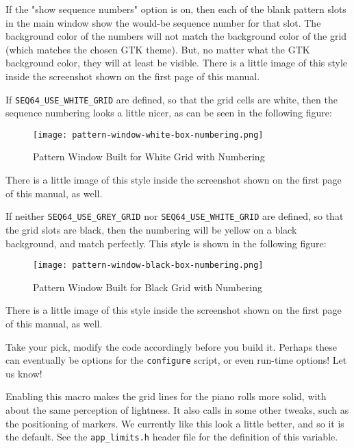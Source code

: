         If the "show sequence numbers" option is on, then each
        of the blank pattern slots in the main window show the would-be
        sequence number for that slot.  The background color of the numbers
        will not match the background color of the grid (which matches the
        chosen GTK theme).  But, no matter what the GTK background color, they
        will at least be visible.  There is a little image of this style inside
        the screenshot shown on the first page of this manual.

        If \texttt{SEQ64\_USE\_WHITE\_GRID}
        are defined, so that the grid cells are white, then the sequence
        numbering looks a little nicer, as can be seen in the following
        figure:

\begin{figure}[H]
   \centering 
   \texttt{[image: pattern-window-white-box-numbering.png]}
   \caption{Pattern Window Built for White Grid with Numbering}
   \label{fig:seq64_build_white_box_numbering}
\end{figure}

        There is a little image of this style inside the screenshot shown on
        the first page of this manual, as well.

        If neither \texttt{SEQ64\_USE\_GREY\_GRID} nor
        \texttt{SEQ64\_USE\_WHITE\_GRID} are defined, so that the grid slots
        are black, then the numbering will be yellow on a black background, and
        match perfectly.  This style is shown in the following figure:

\begin{figure}[H]
   \centering 
   \texttt{[image: pattern-window-black-box-numbering.png]}
   \caption{Pattern Window Built for Black Grid with Numbering}
   \label{fig:seq64_build_black_box_numbering}
\end{figure}

      There is a little image of this style inside the screenshot shown on
      the first page of this manual, as well.

      Take your pick, modify the code accordingly before you build it.
      Perhaps these can eventually be options for the \texttt{configure}
      script, or even run-time options!  Let us know!

        Enabling this macro makes the grid lines for the piano rolls
        more solid, with about the same perception of lightness.
        It also calls in some other tweaks, such as the positioning of
        markers.  We currently like this look a little better, and so it is
        the default.  See the \texttt{app\_limits.h}
        header file for the definition of this variable.

